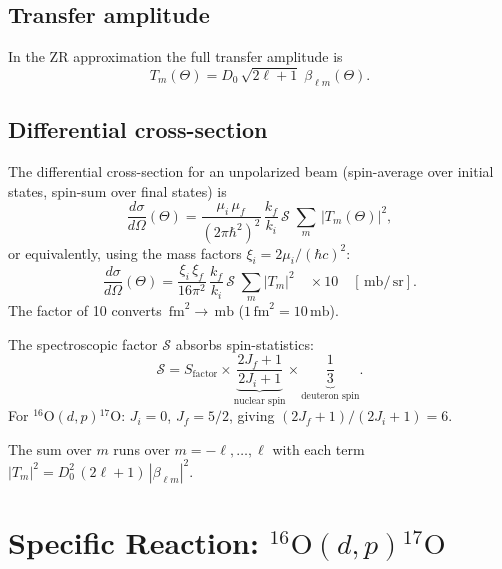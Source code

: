 \documentclass[12pt,a4paper]{article}
\newcommand{\fm}{\,\mathrm{fm}}
\newcommand{\sr}{\,\mathrm{sr}}
\newcommand{\mb}{\,\mathrm{mb}}
\begin{document}
\subsection{Transfer amplitude}

In the ZR approximation the full transfer amplitude is
\begin{equation}
  T_m(\Theta) = D_0\,\sqrt{2\ell+1}\;\beta_{\ell m}(\Theta).
  \label{eq:transfer-amplitude}
\end{equation}

\subsection{Differential cross-section}

The differential cross-section for an unpolarized beam (spin-average
over initial states, spin-sum over final states) is
\begin{equation}
  \frac{d\sigma}{d\Omega}(\Theta)
  = \frac{\mu_i\,\mu_f}{(2\pi\hbar^2)^2}\,\frac{k_f}{k_i}\,
    \mathcal{S}\;
    \sum_{m}\,|T_m(\Theta)|^2,
  \label{eq:dsigma-kinematics}
\end{equation}
or equivalently, using the mass factors $\xi_i = 2\mu_i/(\hbar c)^2$:
\begin{equation}
  \frac{d\sigma}{d\Omega}(\Theta)
  = \frac{\xi_i\,\xi_f}{16\pi^2}\,\frac{k_f}{k_i}\,
    \mathcal{S}\;
    \sum_{m}|T_m|^2
  \quad\times 10 \quad [\mb/\sr].
  \label{eq:dsigma-massfactor}
\end{equation}
The factor of 10 converts $\fm^2 \to \mb$ ($1\fm^2 = 10\mb$).

The spectroscopic factor $\mathcal{S}$ absorbs spin-statistics:
\begin{equation}
  \mathcal{S}
  = S_\mathrm{factor}
    \times \underbrace{\frac{2J_f+1}{2J_i+1}}_{\text{nuclear spin}}
    \times \underbrace{\frac{1}{3}}_{\text{deuteron spin}}.
  \label{eq:spectroscopic}
\end{equation}
For ${}^{16}\mathrm{O}(d,p){}^{17}\mathrm{O}$: $J_i = 0$,
$J_f = 5/2$, giving $(2J_f+1)/(2J_i+1) = 6$.

The sum over $m$ runs over $m = -\ell, \ldots, \ell$ with each term
$|T_m|^2 = D_0^2\,(2\ell+1)\,|\beta_{\ell m}|^2$.

\section{Specific Reaction: ${}^{16}\mathrm{O}(d,p){}^{17}\mathrm{O}$}
\end{document}

